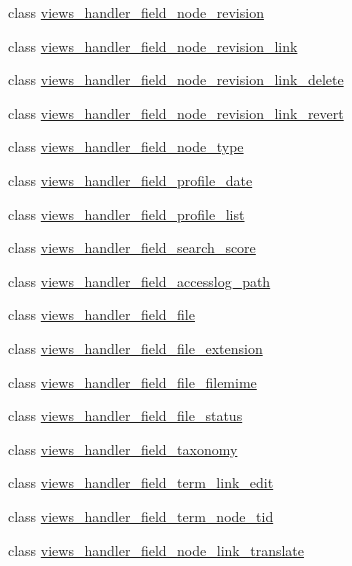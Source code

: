 \begin{DoxyCompactItemize}
\item 
class \hyperlink{classviews__handler__field__node__revision}{views\_\-handler\_\-field\_\-node\_\-revision}
\item 
class \hyperlink{classviews__handler__field__node__revision__link}{views\_\-handler\_\-field\_\-node\_\-revision\_\-link}
\item 
class \hyperlink{classviews__handler__field__node__revision__link__delete}{views\_\-handler\_\-field\_\-node\_\-revision\_\-link\_\-delete}
\item 
class \hyperlink{classviews__handler__field__node__revision__link__revert}{views\_\-handler\_\-field\_\-node\_\-revision\_\-link\_\-revert}
\item 
class \hyperlink{classviews__handler__field__node__type}{views\_\-handler\_\-field\_\-node\_\-type}
\item 
class \hyperlink{classviews__handler__field__profile__date}{views\_\-handler\_\-field\_\-profile\_\-date}
\item 
class \hyperlink{classviews__handler__field__profile__list}{views\_\-handler\_\-field\_\-profile\_\-list}
\item 
class \hyperlink{classviews__handler__field__search__score}{views\_\-handler\_\-field\_\-search\_\-score}
\item 
class \hyperlink{classviews__handler__field__accesslog__path}{views\_\-handler\_\-field\_\-accesslog\_\-path}
\item 
class \hyperlink{classviews__handler__field__file}{views\_\-handler\_\-field\_\-file}
\item 
class \hyperlink{classviews__handler__field__file__extension}{views\_\-handler\_\-field\_\-file\_\-extension}
\item 
class \hyperlink{classviews__handler__field__file__filemime}{views\_\-handler\_\-field\_\-file\_\-filemime}
\item 
class \hyperlink{classviews__handler__field__file__status}{views\_\-handler\_\-field\_\-file\_\-status}
\item 
class \hyperlink{classviews__handler__field__taxonomy}{views\_\-handler\_\-field\_\-taxonomy}
\item 
class \hyperlink{classviews__handler__field__term__link__edit}{views\_\-handler\_\-field\_\-term\_\-link\_\-edit}
\item 
class \hyperlink{classviews__handler__field__term__node__tid}{views\_\-handler\_\-field\_\-term\_\-node\_\-tid}
\item 
class \hyperlink{classviews__handler__field__node__link__translate}{views\_\-handler\_\-field\_\-node\_\-link\_\-translate}

\end{DoxyCompactItemize}
